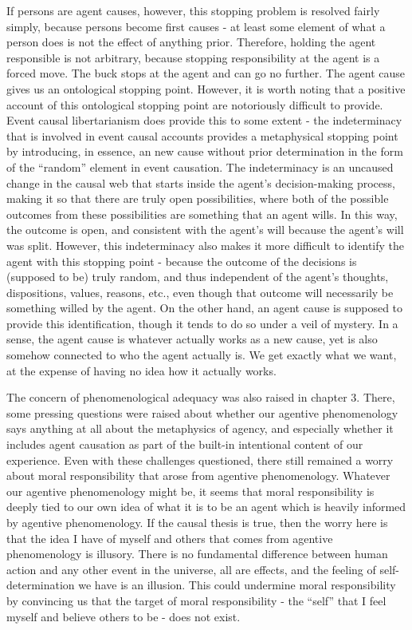 \documentclass[phd,12pt,oneside,paper=letterpaper]{ubcthesis}
\begin{document}
If persons are agent causes, however, this stopping problem is resolved fairly simply, because persons become first causes - at least some element of what a person does is not the effect of anything prior. Therefore, holding the agent responsible is not arbitrary, because stopping responsibility at the agent is a forced move. The buck stops at the agent and can go no further. The agent cause gives us an ontological stopping point. However, it is worth noting that a positive account of this ontological stopping point are notoriously difficult to provide. Event causal libertarianism does provide this to some extent - the indeterminacy that is involved in event causal accounts \citep{kane1999, balaguer2004} provides a metaphysical stopping point by introducing, in essence, an new cause without prior determination in the form of the ``random'' element in event causation. The indeterminacy is an uncaused change in the causal web that starts inside the agent's decision-making process, making it so that there are truly open possibilities, where both of the possible outcomes from these possibilities are something that an agent wills. In this way, the outcome is open, and consistent with the agent's will because the agent's will was split.  However, this indeterminacy also makes it more difficult to identify the agent with this stopping point - because the outcome of the decisions is (supposed to be) truly random, and thus independent of the agent's thoughts, dispositions, values, reasons, etc., even though that outcome will necessarily be something willed by the agent. On the other hand, an agent cause is supposed to provide this identification, though it tends to do so under a veil of mystery. In a sense, the agent cause is whatever actually works as a new cause, yet is also somehow connected to who the agent actually is. We get exactly what we want, at the expense of having no idea how it actually works.

The concern of phenomenological adequacy was also raised in chapter 3. There, some pressing questions were raised about whether our agentive phenomenology says anything at all about the metaphysics of agency, and especially whether it includes agent causation as part of the built-in intentional content of our experience. Even with these challenges questioned, there still remained a worry about moral responsibility that arose from agentive phenomenology. Whatever our agentive phenomenology might be, it seems that moral responsibility is deeply tied to our own idea of what it is to be an agent which is heavily informed by agentive phenomenology.  If the causal thesis is true, then the worry here is that the idea I have of myself and others that comes from agentive phenomenology is illusory. There is no fundamental difference between human action and any other event in the universe, all are effects, and the feeling of self-determination we have is an illusion. This could undermine moral responsibility by convincing us that the target of moral responsibility - the ``self'' that I feel myself and believe others to be - does not exist. 
\end{document}
